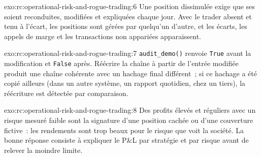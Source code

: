 \begin{solution}{exo:rc:operational-risk-and-rogue-trading:6}
Une position dissimulée exige que ses  soient reconduites, modifiées et expliquées chaque jour. Avec le trader
absent et tenu à l'écart, les positions sont gérées par quelqu'un d'autre, et les écarts, les appels de marge et les transactions non appariées
apparaissent.
\end{solution}

\begin{solution}{exo:rc:operational-risk-and-rogue-trading:7}
\texttt{audit\_demo()} renvoie \texttt{True} avant la modification et \texttt{False} après. Réécrire la chaîne à partir de l'entrée modifiée
produit une chaîne cohérente avec un hachage final différent~; si ce hachage a été copié ailleurs (dans un autre système, un rapport quotidien,
chez un tiers), la réécriture est détectée par comparaison.
\end{solution}

\begin{solution}{exo:rc:operational-risk-and-rogue-trading:8}
Des profits élevés et réguliers avec un risque mesuré faible sont la signature d'une position cachée ou d'une couverture fictive~:
les rendements sont trop beaux pour le risque que voit la société. La bonne réponse consiste à expliquer le P\&L par stratégie et par risque avant de relever la moindre limite.
\end{solution}

